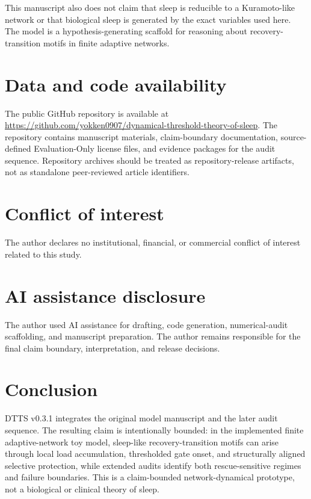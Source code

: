 \documentclass[11pt,a4paper]{article}
\begin{document}
This manuscript also does not claim that sleep is reducible to a Kuramoto-like network or that biological sleep is generated by the exact variables used here. The model is a hypothesis-generating scaffold for reasoning about recovery-transition motifs in finite adaptive networks.

\section{Data and code availability}
The public GitHub repository is available at \url{https://github.com/yokken0907/dynamical-threshold-theory-of-sleep}. The repository contains manuscript materials, claim-boundary documentation, source-defined Evaluation-Only license files, and evidence packages for the audit sequence. Repository archives should be treated as repository-release artifacts, not as standalone peer-reviewed article identifiers.

\section{Conflict of interest}
The author declares no institutional, financial, or commercial conflict of interest related to this study.

\section*{AI assistance disclosure}
The author used AI assistance for drafting, code generation, numerical-audit scaffolding, and manuscript preparation. The author remains responsible for the final claim boundary, interpretation, and release decisions.

\section{Conclusion}
DTTS v0.3.1 integrates the original model manuscript and the later audit sequence. The resulting claim is intentionally bounded: in the implemented finite adaptive-network toy model, sleep-like recovery-transition motifs can arise through local load accumulation, thresholded gate onset, and structurally aligned selective protection, while extended audits identify both rescue-sensitive regimes and failure boundaries. This is a claim-bounded network-dynamical prototype, not a biological or clinical theory of sleep.
\end{document}
